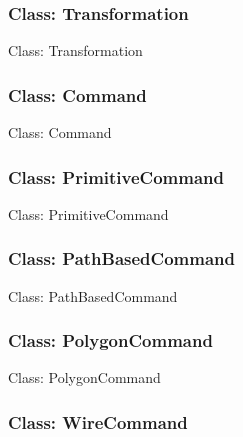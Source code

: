\documentclass[11pt,twoside,openany,x11names,svgnames]{memoir}
\begin{document}
\subsubsection{Class: Transformation}\label{Class-Transformation}

Class: Transformation

\subsubsection{Class: Command}\label{Class-Command}

Class: Command

\subsubsection{Class: PrimitiveCommand}\label{Class-PrimitiveCommand}

Class: PrimitiveCommand

\subsubsection{Class: PathBasedCommand}\label{Class-PathBasedCommand}

Class: PathBasedCommand

\subsubsection{Class: PolygonCommand}\label{Class-PolygonCommand}

Class: PolygonCommand

\subsubsection{Class: WireCommand}\label{Class-WireCommand}
\end{document}
